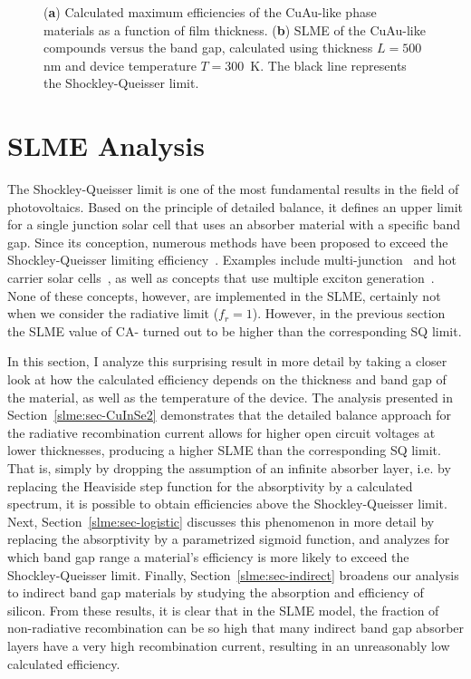 \begin{refsection}
\begin{figure}[ht] 
\centering 
\captionsetup{width=0.9\textwidth}

\caption{(\textbf{a}) Calculated maximum efficiencies of the CuAu-like phase materials as a function of film thickness. (\textbf{b}) \gls{SLME} of the CuAu-like compounds versus the band gap, calculated using thickness $L = 500$ \si{\nano\meter} and 
device temperature $T = 300$~\si{\kelvin}. The black line represents the 
Shockley-Queisser limit.} 
\label{slme:fig-SLME_CuAu} 
\end{figure} 
 
\section{SLME Analysis} \label{slme:sec-analysis} 
 
The Shockley-Queisser limit is one of the most fundamental results in the 
field of photovoltaics. Based on the principle of detailed balance, it defines 
an upper limit for a single junction solar cell that uses an absorber material 
with a specific band gap. Since its conception, numerous methods have been 
proposed to exceed the Shockley-Queisser limiting 
efficiency~\cite{Nelson2013}. Examples include multi-junction~\cite{Shah2004, 
Heremans2009} and hot carrier solar cells~\cite{Konig2010}, as well as 
concepts that use multiple exciton generation~\cite{Hanna2006}. None of these 
concepts, however, are implemented in the \gls{SLME}, certainly not when we consider 
the radiative limit ($f_r = 1$). However, in the previous section the \gls{SLME} 
value of \gls{CA}- turned out to be higher than the corresponding \gls{SQ} limit. 

In this 
section, I analyze this surprising result in more detail by taking a closer 
look at how the calculated efficiency depends on the thickness and band gap of 
the material, as well as the temperature of the device. The analysis presented in Section~\ref{slme:sec-CuInSe2} demonstrates that the 
detailed balance approach for the radiative recombination current allows for 
higher open circuit voltages at lower thicknesses, producing a higher \gls{SLME} 
than the corresponding \gls{SQ} limit. That is, simply by dropping the assumption of 
an infinite absorber layer, i.e. by replacing the Heaviside step function for 
the absorptivity by a calculated spectrum, it is possible to obtain efficiencies above the 
Shockley-Queisser limit. Next, Section~\ref{slme:sec-logistic} discusses this 
phenomenon in more detail by 
replacing the absorptivity by a parametrized sigmoid function, and analyzes for 
which band gap range a material's efficiency is more likely to exceed the 
Shockley-Queisser limit. Finally, Section~\ref{slme:sec-indirect} broadens our analysis to indirect band gap 
materials by studying the absorption and efficiency of silicon. From these results, it is clear that 
in the \gls{SLME} model, the fraction of non-radiative recombination can be so high that 
many indirect band gap absorber layers have a very high recombination 
current, resulting in an unreasonably low calculated efficiency.  
 

\end{refsection}
